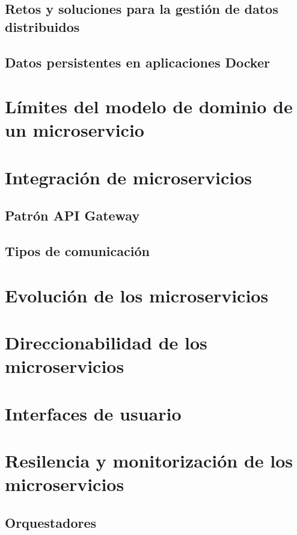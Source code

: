 \documentclass[11pt,a4paper]{article}
\begin{document}
\subsection{Retos y soluciones para la gestión de datos distribuidos}

\subsection{Datos persistentes en aplicaciones Docker}

\section{Límites del modelo de dominio de un microservicio}

\section{Integración de microservicios}

\subsection{Patrón API Gateway}

\subsection{Tipos de comunicación}

\section{Evolución de los microservicios}

\section{Direccionabilidad de los microservicios}

\section{Interfaces de usuario}

\section{Resilencia y monitorización de los microservicios}

\subsection{Orquestadores}
\end{document}
